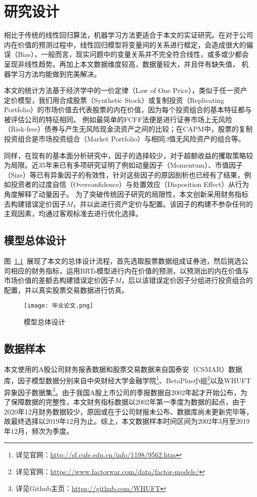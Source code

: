 
\chapter{研究设计}
相比于传统的线性回归算法，机器学习方法更适合于本文的实证研究。在对于公司内在价值的预测过程中，线性回归模型将变量间的关系进行框定，会造成很大的偏误（Bias），一般而言，现实问题中的变量关系并不完全符合线性，或多或少都会呈现非线性趋势。再加上本文数据维度较高，数据量较大，并且伴有缺失值，
机器学习方法均能做到完美解决。

本文的统计方法基于经济学中的一价定律（Law of One Price），类似于任一资产定价模型，我们用合成股票（Synthetic Stock）或复制投资（Replicating Portfolio）的市场价值去代表股票的内在价值，因为每个投资组合的基本特征都与被评估公司的特征相同。
例如最简单的FCFF法便是进行证券市场上无风险（Risk-free）债券与产生无风险现金流资产之间的比较；在CAPM中，股票的复制投资组合是市场投资组合（Market Portfolio）与相同$\beta$值无风险资产的组合等\cite{rossSimpleApproachValuation1978}。

同样，在现有的基本面分析研究中，因子的选择较少，对于超额收益的攫取策略较为局限。近35年来已有多项研究证明了例如动量因子（Momentum）、市值因子（Size）等已有异象因子的有效性，针对这些因子的原因剖析也已经有了结果，例如投资者的过度自信（Overconﬁdence）与处置效应（Disposition Effect）从行为角度解释了动量因子\cite{danielInvestorPsychologySecurity1998, grinblattProspectTheoryMental2005}。
为了突破传统因子研究的局限性，本文创新采用财务指标去构建错误定价因子$M$，并以此进行资产定价与配置。该因子的构建不参杂任何的主观因素，均通过客观标准去进行优化选择。


\section{模型总体设计}
图~\ref{model}~展现了本文的总体设计流程，首先选取股票数据组成证券池，然后挑选公司相应的财务指标，运用BRTs模型进行内在价值的预测，以预测出的内在价值与市场价值的差额去构建错误定价因子$M$，后以该错误定价因子分组进行投资组合的配置，并以真实股票交易数据进行仿真。

\begin{figure}[htbp]
  \centering
    \texttt{[image: 毕业论文.png]}
    \caption{模型总体设计}
    \label{model}
\end{figure}

\section{数据样本}
本文使用的A股公司财务报表数据和股票交易数据来自国泰安（CSMAR）数据库，因子模型数据分别来自中央财经大学金融学院\footnote{详见官网：\url{http://sf.cufe.edu.cn/info/1198/9562.htm}}、BetaPlus小组\footnote{详见官网：\url{https://www.factorwar.com/data/factor-models/}}以及WHUFT异象因子数据集\footnote{详见Github主页：\url{https://github.com/WHUFT}}。由于我国A股上市公司的季报数据自2002年起才开始公布，为了保障数据的完整性，本文财务指标数据以2002年第一季度为数据的起点，由于2020年12月财务数据较少，原因或在于公司财报未公布、数据库尚未更新完毕等，故最终选择以2019年12月为止。综上，本文数据样本时间区间为2002年3月至2019年12月，频次为季度。

